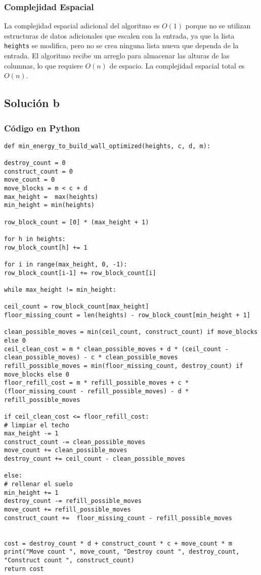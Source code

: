 \documentclass[a4paper,12pt]{article}
\begin{document}
\subsubsection{Complejidad Espacial}

La complejidad espacial adicional del algoritmo es \( O(1) \) porque no se utilizan estructuras de datos adicionales que escalen con la entrada, ya que la lista \texttt{heights} se modifica, pero no se crea ninguna lista nueva que dependa de la entrada. El algoritmo recibe un arreglo para almacenar las alturas de las columnas, lo que requiere \( O(n) \) de espacio. La complejidad espacial total es \( O(n) \).

\subsection{Solución b}

\subsubsection{Código en Python}
\begin{verbatim}
def min_energy_to_build_wall_optimized(heights, c, d, m):

destroy_count = 0
construct_count = 0
move_count = 0
move_blocks = m < c + d
max_height =  max(heights)
min_height = min(heights)

row_block_count = [0] * (max_height + 1)

for h in heights:
row_block_count[h] += 1

for i in range(max_height, 0, -1):
row_block_count[i-1] += row_block_count[i]

while max_height != min_height:   

ceil_count = row_block_count[max_height]
floor_missing_count = len(heights) - row_block_count[min_height + 1] 

clean_possible_moves = min(ceil_count, construct_count) if move_blocks else 0
ceil_clean_cost = m * clean_possible_moves + d * (ceil_count - clean_possible_moves) - c * clean_possible_moves
refill_possible_moves = min(floor_missing_count, destroy_count) if move_blocks else 0
floor_refill_cost = m * refill_possible_moves + c * (floor_missing_count - refill_possible_moves) - d * refill_possible_moves

if ceil_clean_cost <= floor_refill_cost:
# limpiar el techo
max_height -= 1
construct_count -= clean_possible_moves
move_count += clean_possible_moves
destroy_count += ceil_count - clean_possible_moves

else: 
# rellenar el suelo
min_height += 1
destroy_count -= refill_possible_moves
move_count += refill_possible_moves
construct_count +=  floor_missing_count - refill_possible_moves


cost = destroy_count * d + construct_count * c + move_count * m
print("Move count ", move_count, "Destroy count ", destroy_count, "Construct count ", construct_count)
return cost
\end{verbatim}
\end{document}
